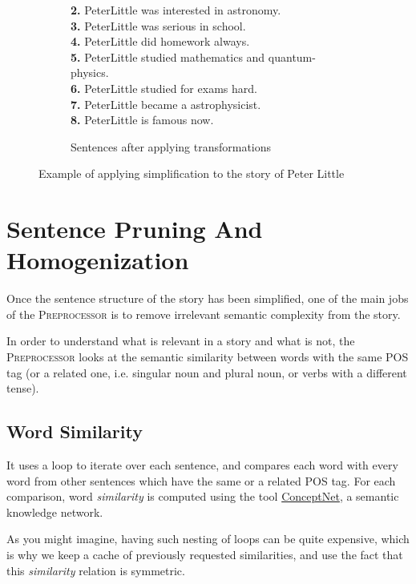 \begin{figure}[H]
\begin{subfigure}{\textwidth}
\begin{displayquote}
\textbf{2.}  PeterLittle was interested in  astronomy.\\
\textbf{3.}  PeterLittle was serious in school.\\
\textbf{4.}  PeterLittle did  homework  always.\\
\textbf{5.}  PeterLittle studied mathematics and  quantum-physics.\\
\textbf{6.} PeterLittle studied for  exams hard.\\
\textbf{7.} PeterLittle became  a astrophysicist.\\
\textbf{8.} PeterLittle is famous  now.
\caption{Sentences after applying transformations}
\end{displayquote}
\end{subfigure}
\caption{Example of applying simplification to the story of Peter Little}
\label{fig:simplification_example}
\end{figure}

\section{Sentence Pruning And Homogenization}

Once the sentence structure of the story has been simplified, one of the main jobs of the \textsc{Preprocessor} is to remove irrelevant semantic complexity from the story.

In order to understand what is relevant in a story and what is not, the \textsc{Preprocessor} looks at the semantic similarity between words with the same POS tag (or a related one, i.e. singular noun and plural noun, or verbs with a different tense).

\subsection{Word Similarity}

It uses a loop to iterate over each sentence, and compares each word with every word from other sentences which have the same or a related POS tag. For each comparison, word \textit{similarity} is computed using the tool \href{http://www.conceptnet.io}{ConceptNet}, a semantic knowledge network.

As you might imagine, having such nesting of loops can be quite expensive, which is why we keep a cache of previously requested similarities, and use the fact that this \textit{similarity} relation is symmetric.

